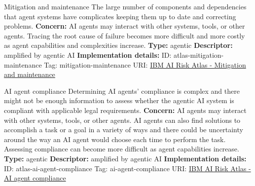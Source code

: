 \documentclass[a4paper,12pt]{article}
\begin{document}
\begin{definitionbox}{Mitigation and maintenance}
The large number of components and dependencies that agent systems have complicates keeping them up to date and correcting problems.\newline\newline
\textbf{Concern: }AI agents may interact with other systems, tools, or other agents. Tracing the root cause of failure becomes more difficult and more costly as agent capabilities and complexities increase.\newline\newline
\textbf{Type: }agentic\newline
\textbf{Descriptor: }amplified by agentic AI \newline\newline
\textbf{Implementation details: } \newline
ID: atlas-mitigation-maintenance \newline
Tag: mitigation-maintenance \newline
URI:  \href{https://www.ibm.com/docs/en/watsonx/saas?topic=SSYOK8/wsj/ai-risk-atlas/mitigation-maintenance.html}{IBM AI Risk Atlas - Mitigation and maintenance}\newline
\end{definitionbox}
\begin{definitionbox}{AI agent compliance}
Determining AI agents' compliance is complex and there might not be enough information to assess whether the agentic AI system is compliant with applicable legal requirements.\newline\newline
\textbf{Concern: }AI agents may interact with other systems, tools, or other agents. AI agents can also find solutions to accomplish a task or a goal in a variety of ways and there could be uncertainty around the way an AI agent would choose each time to perform the task. Assessing compliance can become more difficult as agent capabilities increase.\newline\newline
\textbf{Type: }agentic\newline
\textbf{Descriptor: }amplified by agentic AI \newline\newline
\textbf{Implementation details: } \newline
ID: atlas-ai-agent-compliance \newline
Tag: ai-agent-compliance \newline
URI:  \href{https://www.ibm.com/docs/en/watsonx/saas?topic=SSYOK8/wsj/ai-risk-atlas/ai-agent-compliance.html}{IBM AI Risk Atlas - AI agent compliance}\newline
\end{definitionbox}
\end{document}
